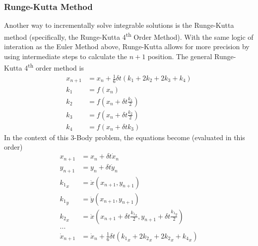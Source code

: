 \documentclass[preprint,titlepage,preprintnumbers,amsmath,amssymb,aps,11pt]{revtex4-2}
\begin{document}
\subsubsection{Runge-Kutta Method}
Another way to incrementally solve integrable solutions is the Runge-Kutta method (specifically, the Runge-Kutta 4\textsuperscript{th} Order Method). With the same logic of interation as the Euler Method above, Runge-Kutta allows for more precision by using intermediate steps to calculate the $n+1$ position. The general Runge-Kutta 4\textsuperscript{th} order method is
\begin{equation}
    \begin{aligned}
        x_{n+1} & =x_n+\frac{1}{6}\delta t(k_1+2k_2+2k_3+k_4) \\
        k_1     & =f(x_n)                                     \\
        k_2     & =f(x_n+\delta t\frac{k_1}{2})               \\
        k_3     & =f(x_n+\delta t\frac{k_2}{2})               \\
        k_4     & =f(x_n+\delta tk_3)
    \end{aligned}
\end{equation}
In the context of this 3-Body problem, the equations become (evaluated in this order)
\begin{equation}
    \begin{aligned}
        x_{n+1}       & = x_n + \delta t\dot{x}_n                                                          \\
        y_{n+1}       & = y_n + \delta t\dot{y}_n                                                          \\
        {k_1}_x       & = \ddot{x}(x_{n+1},y_{n+1})                                                        \\
        {k_1}_y       & = \ddot{y}(x_{n+1},y_{n+1})                                                        \\
        {k_2}_x       & = \ddot{x}(x_{n+1}+ \delta t \frac{{k_1}_x}{2}, y_{n+1}+\delta t\frac{{k_1}_y}{2}) \\
        ...                                                                                                \\
        \dot{x}_{n+1} & = \dot{x}_n + \frac{1}{6}\delta t({k_1}_x+2{k_2}_x+2{k_2}_x+{k_4}_x)
    \end{aligned}
\end{equation}
\end{document}
